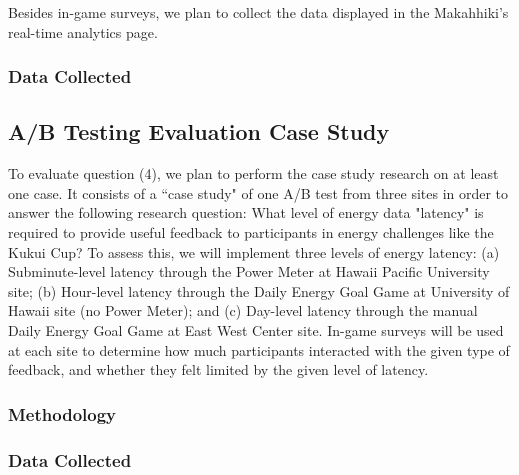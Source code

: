 \documentclass[11pt]{article}
\begin{document}
Besides in-game surveys, we plan to collect the data displayed in the Makahhiki's real-time analytics page. 

\subsubsection{Data Collected}

\subsection{A/B Testing Evaluation Case Study}
To evaluate question (4), we plan to perform the case study research on at least one case. It consists of a ``case study" of one A/B test from three sites in order to answer the following research question: What level of energy data "latency" is required to provide useful feedback to participants in energy challenges like the Kukui Cup?  To assess this, we will implement three levels of energy latency:  (a) Subminute-level latency through the Power Meter at Hawaii Pacific University site; (b) Hour-level latency through the Daily Energy Goal Game at University of Hawaii site (no Power Meter); and (c) Day-level latency through the manual Daily Energy Goal Game at East West Center site.  In-game surveys will  be used at each site to determine how much participants interacted with the given type of feedback, and whether they felt limited by the given level of latency.

\subsubsection{Methodology}

\subsubsection{Data Collected}
  
\end{document}
